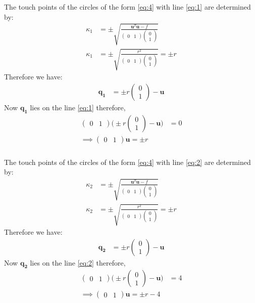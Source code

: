 \documentclass{beamer}
\newcommand{\myvec}[1]{\ensuremath{\begin{pmatrix}#1\end{pmatrix}}}
\renewcommand{\vec}[1]{\mathbf{#1}}
\begin{document}
\begin{frame}
\frametitle{}
The touch points of the circles of the form \eqref{eq:4}  with line \eqref{eq:1} are determined by:
\begin{align}
\kappa_{1} &= \pm \sqrt{\frac{\vec{u}^T\vec{u}-f}{\myvec{0 & 1 }\myvec{0 \\ 1 }}} \\
\kappa_{1} &= \pm \sqrt{\frac{r^2}{\myvec{0 & 1 }\myvec{0 \\ 1 }}} =  \pm {r}
\end{align}
Therefore we have:
\begin{align}
\vec{q_{1}} &= \pm{r}\myvec{0 \\ 1} - \vec{u}
\end{align}
Now $\vec{q_{1}}$ lies on the line \eqref{eq:1} therefore,
\begin{align}
\myvec{0 & 1}\Big(\pm{r}\myvec{0 \\ 1} - \vec{u}\Big) &= 0 \\
\implies \myvec{0 & 1}\vec{u} = \pm{r}\label{eq:10}
\end{align}
\end{frame}

\begin{frame}
\frametitle{}
The touch points of the circles of the form \eqref{eq:4}  with line \eqref{eq:2} are determined by:
\begin{align}
\kappa_{2} &= \pm \sqrt{\frac{\vec{u}^T\vec{u}-f}{\myvec{0 & 1 }\myvec{0 \\ 1 }}} \\
\kappa_{2} &= \pm \sqrt{\frac{r^2}{\myvec{0 & 1 }\myvec{0 \\ 1 }}} = \pm {r}
\end{align}
Therefore we have:
\begin{align}
\vec{q_{2}} &= \pm{r}\myvec{0 \\ 1} - \vec{u}
\end{align}
Now $\vec{q_{2}}$ lies on the line \eqref{eq:2} therefore,
\begin{align}
\myvec{0 & 1}\Big(\pm{r}\myvec{0 \\ 1} - \vec{u}\Big) &= 4 \\
\implies \myvec{0 & 1}\vec{u} = \pm{r}-4\label{eq:11}
\end{align}
\end{frame}
\end{document}
